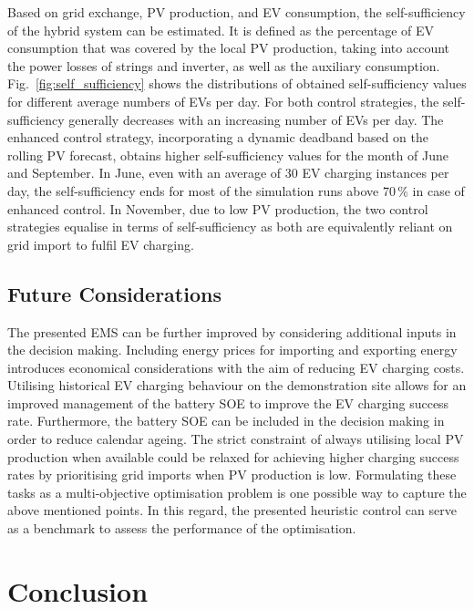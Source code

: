 \documentclass[final,5p,times,twocolumn]{elsarticle}
\begin{document}
Based on grid exchange, PV production, and EV consumption, the self-sufficiency of the hybrid system can be estimated. It is defined as the percentage of EV consumption that was covered by the local PV production, taking into account the power losses of strings and inverter, as well as the auxiliary consumption. Fig.~\ref{fig:self_sufficiency} shows the distributions of obtained self-sufficiency values for different average numbers of EVs per day. For both control strategies, the self-sufficiency generally decreases with an increasing number of EVs per day. The enhanced control strategy, incorporating a dynamic deadband based on the rolling PV forecast, obtains higher self-sufficiency values for the month of June and September. In June, even with an average of 30 EV charging instances per day, the self-sufficiency ends for most of the simulation runs above 70\,\% in case of enhanced control. In November, due to low PV production, the two control strategies equalise in terms of self-sufficiency as both are equivalently reliant on grid import to fulfil EV charging. 

\subsection{Future Considerations}

The presented EMS can be further improved by considering additional inputs in the decision making. Including energy prices for importing and exporting energy introduces economical considerations with the aim of reducing EV charging costs. Utilising historical EV charging behaviour on the demonstration site allows for an improved management of the battery SOE to improve the EV charging success rate. Furthermore, the battery SOE can be included in the decision making in order to reduce calendar ageing. The strict constraint of always utilising local PV production when available could be relaxed for achieving higher charging success rates by prioritising grid imports when PV production is low. Formulating these tasks as a multi-objective optimisation problem is one possible way to capture the above mentioned points. In this regard, the presented heuristic control can serve as a benchmark to assess the performance of the optimisation.

\section{Conclusion}\label{sec:conclusion}
\end{document}
